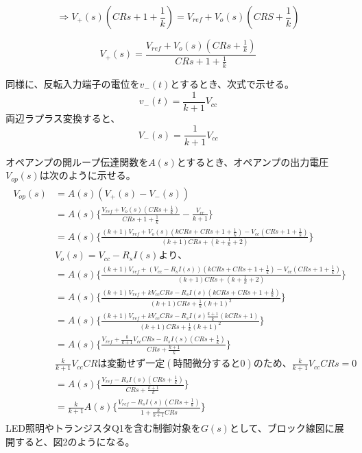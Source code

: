 \documentclass{ltjsarticle}
\begin{document}
\begin{equation*}
    \Rightarrow V_{+}(s)(CRs+1+\frac{1}{k}) = V_{ref} + V_{o}(s)(CRS+\frac{1}{k})
\end{equation*}

\begin{equation}
    V_{+}(s) = \frac{V_{ref}+V_{o}(s)(CRs + \frac{1}{k})}{CRs + 1+ \frac{1}{k}}
\end{equation}

同様に、反転入力端子の電位を$v_{-}(t)$とするとき、次式で示せる。
\begin{equation}
    v_{-}(t) = \frac{1}{k+1}V_{cc}
\end{equation}
両辺ラプラス変換すると、
\begin{equation}
    V_{-}(s) = \frac{1}{k+1}V_{cc}
\end{equation}

オペアンプの開ループ伝達関数を$A(s)$とするとき、オペアンプの出力電圧$V_{op}(s)$は次のように示せる。
\begin{gather*}
    \begin{aligned}
    V_{op}(s) &= A(s)(V_{+}(s) - V_{-}(s)) \\
    &=A(s)\{\frac{V_{ref} + V_{o}(s)(CRs + \frac{1}{k})}{CRs + 1+ \frac{1}{k}} - \frac{V_{cc}}{k+1}\} \\
    &=A(s)\{\frac{(k+1)V_{ref} + V_{o}(s)(kCRs + CRs + 1 + \frac{1}{k}) - V_{cc}(CRs + 1 + \frac{1}{k})}{(k+1)CRs+(k + \frac{1}{k} + 2)}\} \\
    &V_{o}(s) = V_{cc} - R_{s}I(s)より、\\
    &=A(s)\{\frac{(k+1)V_{ref} + (V_{cc} - R_{s}I(s))(kCRs + CRs + 1 + \frac{1}{k}) - V_{cc}(CRs + 1 + \frac{1}{k})}{(k+1)CRs+(k + \frac{1}{k} + 2)}\} \\
    &=A(s)\{\frac{(k+1)V_{ref} + kV_{cc}CRs - R_{s}I(s)(kCRs+CRs+1+\frac{1}{k})}{(k+1)CRs + \frac{1}{k}(k+1)^2} \} \\
    &=A(s)\{\frac{(k+1)V_{ref} + kV_{cc}CRs - R_{s}I(s)\frac{k+1}{k}(kCRs+1)}{(k+1)CRs + \frac{1}{k}(k+1)^2} \} \\
    &=A(s)\{\frac{V_{ref} + \frac{k}{k+1}V_{cc}CRs-R_{s}I(s)(CRs+\frac{1}{k})}{CRs + \frac{k+1}{k}}\} \\
    &\frac{k}{k+1}V_{cc}CRは変動せず一定(時間微分すると0)のため、\frac{k}{k+1}V_{cc}CRs = 0 \\
    &=A(s)\{\frac{V_{ref}-R_{s}I(s)(CRs+\frac{1}{k})}{CRs + \frac{k+1}{k}}\} \\
    &=\frac{k}{k+1}A(s)\{\frac{V_{ref}-R_{s}I(s)(CRs+\frac{1}{k})}{1 + \frac{k}{k+1}CRs}\}
    \end{aligned}
\end{gather*}
LED照明やトランジスタQ1を含む制御対象を$G(s)$として、ブロック線図に展開すると、図2のようになる。\\
\end{document}
